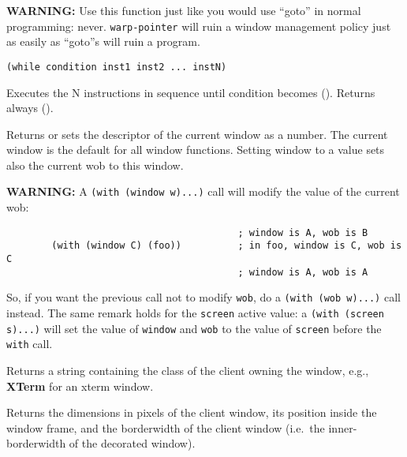 {\bf WARNING:} Use this function just like you would use ``goto'' in
normal programming: never. \verb"warp-pointer" will ruin a window management policy
just as easily as  ``goto''s will ruin a program.

        
{\usagefont\begin{verbatim}
(while condition inst1 inst2 ... instN)
\end{verbatim}}\usageupspace

Executes the N instructions in sequence until condition becomes ().  Returns
always ().      

        

Returns or sets the descriptor of the current window as a {\WOOL} number. The
current window is the default for all window functions. Setting window
to a value sets also the current wob to this window.

{\bf WARNING:} A \verb"(with (window w)...)" call will modify the value of
the current wob:
{\exemplefont\begin{verbatim}
                                         ; window is A, wob is B
        (with (window C) (foo))          ; in foo, window is C, wob is C
                                         ; window is A, wob is A
\end{verbatim}}
So, if you want the previous call not to modify \verb"wob", do a 
\verb"(with (wob w)...)" call instead. The same remark holds for the 
\verb"screen" active value: a \verb"(with (screen s)...)" will set the value
of {\tt window} and {\tt wob} to the value of {\tt screen} before the 
{\tt with} call.


        

Returns a string containing the class of the client owning the window,
e.g., {\bf XTerm} for an xterm window.

        

Returns the dimensions in pixels of the client window, its position
inside the {\GWM} window frame, and the borderwidth of the client
window (i.e.\ the inner-borderwidth of the decorated window).

